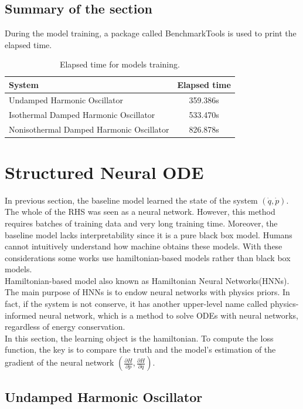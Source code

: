 \subsection{Summary of the section}
During the model training, a package called BenchmarkTools is used to print the elapsed time.

\begin{table}[h!]
	\centering
	\caption{Elapsed time for models training.}
	\label{tab:elapsed_time_neural_ODE}
	\begin{tabular}{lc}
		\toprule
		System & Elapsed time \\
		\midrule
		Undamped Harmonic Oscillator & 359.386s \\
		Isothermal Damped Harmonic Oscillator & 533.470s \\
		Nonisothermal Damped Harmonic Oscillator & 826.878s \\
		\bottomrule
	\end{tabular}
\end{table}


\clearpage
\section{Structured Neural ODE}
In previous section, the baseline model learned the state of the system $(\dot{q},\dot{p})$. The whole of the RHS was seen as a neural network. However, this method requires batches of training data and very long training time. Moreover, the baseline model lacks interpretability since it is a pure black box model. Humans cannot intuitively understand how machine obtains these models. With these considerations some works use hamiltonian-based models rather than black box models.\\ Hamiltonian-based model also known as Hamiltonian Neural Networks(HNNs)\cite{SamGreydanusMiskoDzambaJasonYosinski.}. The main purpose of HNNs is to endow neural networks with physics priors.  In fact, if the system is not conserve, it has another upper-level name called physics-informed neural network\cite{MaziarRaissiParisPerdikarisGeorgeEmKarniadakis.}, which is a method to solve ODEs with neural networks, regardless of energy conservation.
\\
In this section, the learning object is the hamiltonian. To compute the loss function, the key is to compare the truth and the model's estimation of the gradient of the neural network $(\frac{\partial{H}}{\partial{p}},\frac{\partial{H}}{\partial{q}})$.
\subsection{Undamped Harmonic Oscillator}

